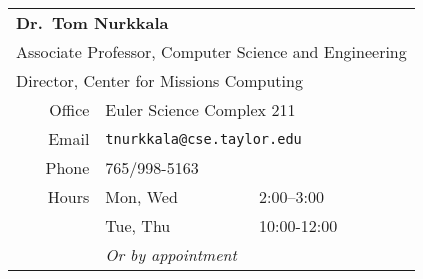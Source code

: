 \begin{center}
  \begin{tabular}{rll}
    \toprule
    \multicolumn{3}{l}{\textbf{Dr.\ Tom Nurkkala}}                            \\
    \multicolumn{3}{l}{Associate Professor, Computer Science and Engineering} \\
    \multicolumn{3}{l}{Director, Center for Missions Computing}               \\
    \midrule
    Office & \multicolumn{2}{l}{Euler Science Complex 211}                    \\
    Email  & \multicolumn{2}{l}{\texttt{tnurkkala@cse.taylor.edu}}            \\
    Phone  & \multicolumn{2}{l}{765/998-5163}                                 \\
    Hours  & Mon, Wed & 2:00--3:00                                            \\
           & Tue, Thu & 10:00-12:00                                           \\
           & \multicolumn{2}{l}{\emph{Or by appointment}}                     \\
    \bottomrule
  \end{tabular}
\end{center}


